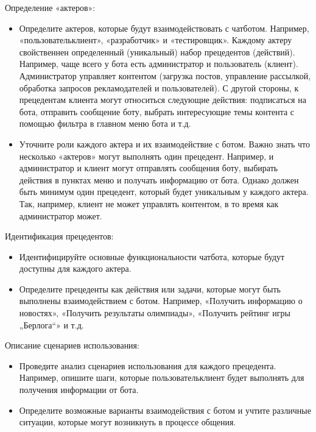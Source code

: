 \documentclass[letterpaper,10pt,russian]{sphinxmanual}
\begin{document}
 Определение «актеров»:
\begin{itemize}
\item {} 
\sphinxAtStartPar
Определите актеров, которые будут взаимодействовать с чат\sphinxhyphen{}ботом. Например, «пользователь\sphinxhyphen{}клиент», «разработчик» и «тестировщик». Каждому актеру свойственнен определенный (уникальный) набор прецедентов (действий). Например, чаще всего у бота есть администратор и пользователь (клиент). Администратор управляет контентом (загрузка постов, управление рассылкой, обработка запросов рекламодателей и пользователей). С другой стороны, к прецедентам клиента могут относиться следующие действия: подписаться на бота, отправить сообщение боту, выбрать интересующие темы контента с помощью фильтра в главном меню бота и т.д.

\item {} 
\sphinxAtStartPar
Уточните роли каждого актера и их взаимодействие с ботом. Важно знать что несколько «актеров» могут выполнять один прецедент. Например, и администратор и клиент могут отправлять сообщения боту, выбирать действия в пунктах меню и получать информацию от бота. Однако должен быть минимум один прецедент, который будет уникальным у каждого актера. Так, например, клиент не может управлять контентом, в то время как администратор может.

\end{itemize}

 Идентификация прецедентов:
\begin{itemize}
\item {} 
\sphinxAtStartPar
Идентифицируйте основные функциональности чат\sphinxhyphen{}бота, которые будут доступны для каждого актера.

\item {} 
\sphinxAtStartPar
Определите прецеденты как действия или задачи, которые могут быть выполнены взаимодействием с ботом. Например, «Получить информацию о новостях», «Получить результаты олимпиады», «Получить рейтинг игры „Берлога“» и т.д.

\end{itemize}

 Описание сценариев использования:
\begin{itemize}
\item {} 
\sphinxAtStartPar
Проведите анализ сценариев использования для каждого прецедента. Например, опишите шаги, которые пользователь\sphinxhyphen{}клиент будет выполнять для получения информации от бота.

\item {} 
\sphinxAtStartPar
Определите возможные варианты взаимодействия с ботом и учтите различные ситуации, которые могут возникнуть в процессе общения.

\end{itemize}
\end{document}
